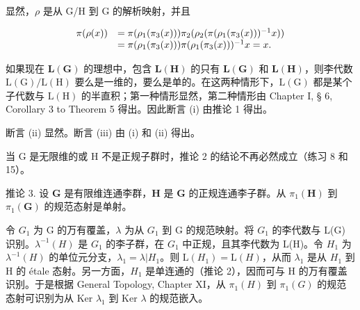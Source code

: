 显然，\(\rho\) 是从 G/H 到 G 的解析映射，并且

\[
\begin{array}{r l} \pi (\rho (x)) & = \pi (\rho_ {1} (\pi_ {3} (x))) \pi_ {2} (\rho_ {2} (\pi (\rho_ {1} (\pi_ {3} (x))) ^ {- 1} x)) \\ & = \pi (\rho_ {1} (\pi_ {3} (x))) \pi (\rho_ {1} (\pi_ {3} (x))) ^ {- 1} x = x. \end{array}
\]

如果现在 \(\mathbf{L}(\mathbf{G})\) 的理想中，包含 \(\mathbf{L}(\mathbf{H})\) 的只有 \(\mathbf{L}(\mathbf{G})\) 和 \(\mathbf{L}(\mathbf{H})\)，则李代数 \(\mathrm{L(G) / L(H)}\) 要么是一维的，要么是单的。在这两种情形下，\(\mathrm{L(G)}\) 都是某个子代数与 \(\mathrm{L(H)}\) 的半直积；第一种情形显然，第二种情形由 Chapter I, § 6, Corollary 3 to Theorem 5 得出。因此断言 (i) 由推论 1 得出。

断言 (ii) 显然。断言 (iii) 由 (i) 和 (ii) 得出。

当 G 是无限维的或 H 不是正规子群时，推论 2 的结论不再必然成立（练习 8 和 15）。

推论 3. 设 \(\mathbf{G}\) 是有限维连通李群，\(\mathbf{H}\) 是 \(\mathbf{G}\) 的正规连通李子群。从 \(\pi_1(\mathbf{H})\) 到 \(\pi_1(\mathbf{G})\) 的规范态射是单射。

令 \(G_{1}\) 为 G 的万有覆盖，\(\lambda\) 为从 \(G_{1}\) 到 G 的规范映射。将 \(G_{1}\) 的李代数与 L(G) 识别。\(\lambda^{-1}(H)\) 是 \(G_{1}\) 的李子群，在 \(G_{1}\) 中正规，且其李代数为 L(H)。令 \(H_{1}\) 为 \(\lambda^{-1}(H)\) 的单位元分支，\(\lambda_{1} = \lambda | H_{1}\)。则 \(\mathrm{L}(H_{1}) = \mathrm{L}(H)\)，从而 \(\lambda_{1}\) 是从 \(H_{1}\) 到 H 的 étale 态射。另一方面，\(H_{1}\) 是单连通的（推论 2），因而可与 H 的万有覆盖识别。于是根据 General Topology, Chapter XI，从 \(\pi_{1}(H)\) 到 \(\pi_{1}(G)\) 的规范态射可识别为从 Ker \(\lambda_{1}\) 到 Ker \(\lambda\) 的规范嵌入。

